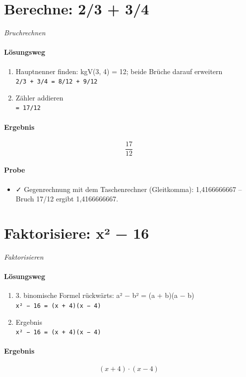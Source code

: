 \documentclass[11pt,a4paper]{article}
\begin{document}
\section*{Berechne: 2/3 + 3/4}
\textit{Bruchrechnen}

\paragraph{Lösungsweg}
\begin{enumerate}
  \item Hauptnenner finden: kgV(3, 4) = 12; beide Brüche darauf erweitern\\
  \texttt{2/3 + 3/4 = 8/12 + 9/12}
  \item Zähler addieren\\
  \texttt{= 17/12}
\end{enumerate}
\paragraph{Ergebnis}
\[ \frac{17}{12} \]
\paragraph{Probe}
\begin{itemize}
  \item ✓ Gegenrechnung mit dem Taschenrechner (Gleitkomma): 1,4166666667 – Bruch 17/12 ergibt 1,4166666667.
\end{itemize}
\section*{Faktorisiere: x² − 16}
\textit{Faktorisieren}

\paragraph{Lösungsweg}
\begin{enumerate}
  \item 3. binomische Formel rückwärts: a² − b² = (a + b)(a − b)\\
  \texttt{x² − 16 = (x + 4)(x − 4)}
  \item Ergebnis\\
  \texttt{x² − 16 = (x + 4)(x − 4)}
\end{enumerate}
\paragraph{Ergebnis}
\[ \left(x + 4\right) \cdot \left(x - 4\right) \]
\end{document}

